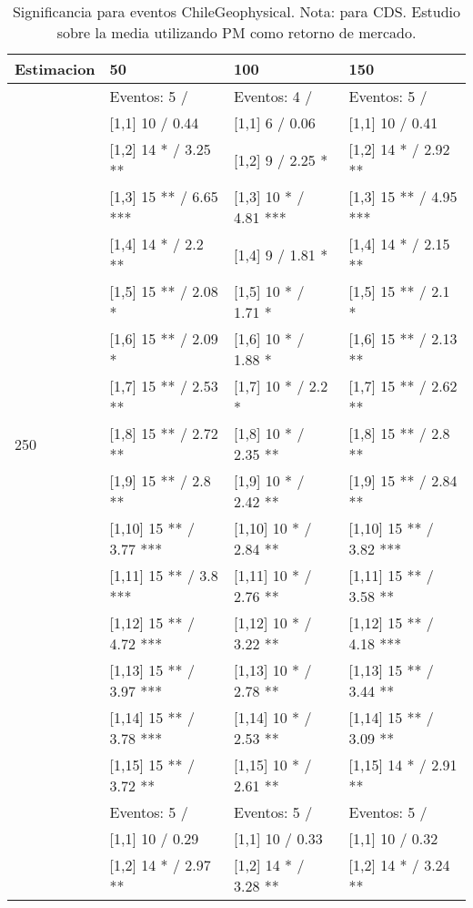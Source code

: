 \begin{table}

\caption{Significancia para eventos ChileGeophysical. Nota: para CDS. Estudio sobre la media utilizando PM como retorno de mercado.}
\centering
\begin{tabular}[t]{llll}
\toprule
Estimacion & 50 & 100 & 150\\
\midrule
 & Eventos:  5 / & Eventos:  4 / & Eventos:  5 /\\
 & {}[1,1] 10  / 0.44 & {}[1,1] 6  / 0.06 & {}[1,1] 10  / 0.41\\
 & {}[1,2] 14 * / 3.25 ** & {}[1,2] 9  / 2.25 * & {}[1,2] 14 * / 2.92 **\\
 & {}[1,3] 15 ** / 6.65 *** & {}[1,3] 10 * / 4.81 *** & {}[1,3] 15 ** / 4.95 ***\\
 & {}[1,4] 14 * / 2.2 ** & {}[1,4] 9  / 1.81 * & {}[1,4] 14 * / 2.15 **\\
\addlinespace
 & {}[1,5] 15 ** / 2.08 * & {}[1,5] 10 * / 1.71 * & {}[1,5] 15 ** / 2.1 *\\
 & {}[1,6] 15 ** / 2.09 * & {}[1,6] 10 * / 1.88 * & {}[1,6] 15 ** / 2.13 **\\
 & {}[1,7] 15 ** / 2.53 ** & {}[1,7] 10 * / 2.2 * & {}[1,7] 15 ** / 2.62 **\\
250 & {}[1,8] 15 ** / 2.72 ** & {}[1,8] 10 * / 2.35 ** & {}[1,8] 15 ** / 2.8 **\\
 & {}[1,9] 15 ** / 2.8 ** & {}[1,9] 10 * / 2.42 ** & {}[1,9] 15 ** / 2.84 **\\
\addlinespace
 & {}[1,10] 15 ** / 3.77 *** & {}[1,10] 10 * / 2.84 ** & {}[1,10] 15 ** / 3.82 ***\\
 & {}[1,11] 15 ** / 3.8 *** & {}[1,11] 10 * / 2.76 ** & {}[1,11] 15 ** / 3.58 **\\
 & {}[1,12] 15 ** / 4.72 *** & {}[1,12] 10 * / 3.22 ** & {}[1,12] 15 ** / 4.18 ***\\
 & {}[1,13] 15 ** / 3.97 *** & {}[1,13] 10 * / 2.78 ** & {}[1,13] 15 ** / 3.44 **\\
 & {}[1,14] 15 ** / 3.78 *** & {}[1,14] 10 * / 2.53 ** & {}[1,14] 15 ** / 3.09 **\\
\addlinespace
 & {}[1,15] 15 ** / 3.72 ** & {}[1,15] 10 * / 2.61 ** & {}[1,15] 14 * / 2.91 **\\
 & Eventos:  5 / & Eventos:  5 / & Eventos:  5 /\\
 & {}[1,1] 10  / 0.29 & {}[1,1] 10  / 0.33 & {}[1,1] 10  / 0.32\\
 & {}[1,2] 14 * / 2.97 ** & {}[1,2] 14 * / 3.28 ** & {}[1,2] 14 * / 3.24 **\\

\end{tabular}
\end{table}
